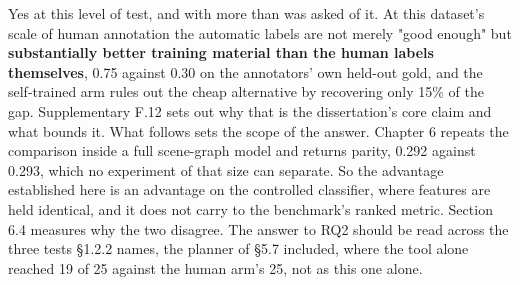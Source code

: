 Yes at this level of test, and with more than was asked of it. At this dataset's scale of human annotation the automatic labels are not merely "good enough" but \textbf{substantially better training material than the human labels themselves}, 0.75 against 0.30 on the annotators' own held-out gold, and the self-trained arm rules out the cheap alternative by recovering only 15\% of the gap. Supplementary F.12 sets out why that is the dissertation's core claim and what bounds it. What follows sets the scope of the answer. Chapter 6 repeats the comparison inside a full scene-graph model and returns parity, 0.292 against 0.293, which no experiment of that size can separate. So the advantage established here is an advantage on the controlled classifier, where features are held identical, and it does not carry to the benchmark's ranked metric. Section 6.4 measures why the two disagree. The answer to RQ2 should be read across the three tests \S{}1.2.2 names, the planner of \S{}5.7 included, where the tool alone reached 19 of 25 against the human arm's 25, not as this one alone.